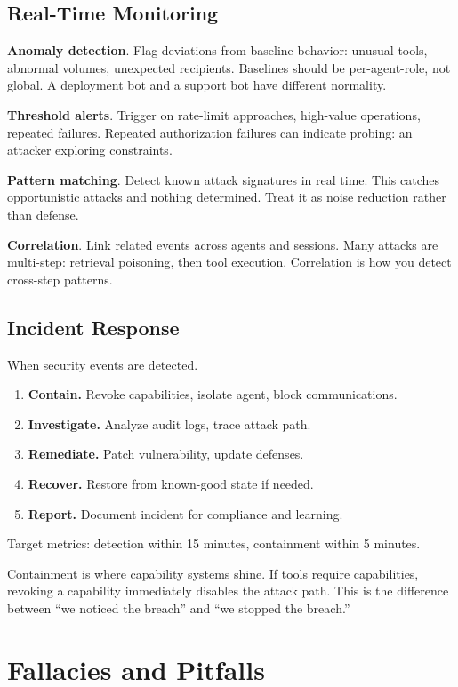 \subsection{Real-Time Monitoring}

\textbf{Anomaly detection}. Flag deviations from baseline behavior: unusual tools, abnormal volumes, unexpected recipients. Baselines should be per-agent-role, not global. A deployment bot and a support bot have different normality.

\textbf{Threshold alerts}. Trigger on rate-limit approaches, high-value operations, repeated failures. Repeated authorization failures can indicate probing: an attacker exploring constraints.

\textbf{Pattern matching}. Detect known attack signatures in real time. This catches opportunistic attacks and nothing determined. Treat it as noise reduction rather than defense.

\textbf{Correlation}. Link related events across agents and sessions. Many attacks are multi-step: retrieval poisoning, then tool execution. Correlation is how you detect cross-step patterns.

\subsection{Incident Response}

When security events are detected.
\begin{enumerate}
\item \textbf{Contain.} Revoke capabilities, isolate agent, block communications.
\item \textbf{Investigate.} Analyze audit logs, trace attack path.
\item \textbf{Remediate.} Patch vulnerability, update defenses.
\item \textbf{Recover.} Restore from known-good state if needed.
\item \textbf{Report.} Document incident for compliance and learning.
\end{enumerate}

Target metrics: detection within 15 minutes, containment within 5 minutes.

Containment is where capability systems shine. If tools require capabilities, revoking a capability immediately disables the attack path. This is the difference between ``we noticed the breach'' and ``we stopped the breach.''

\section{Fallacies and Pitfalls}

